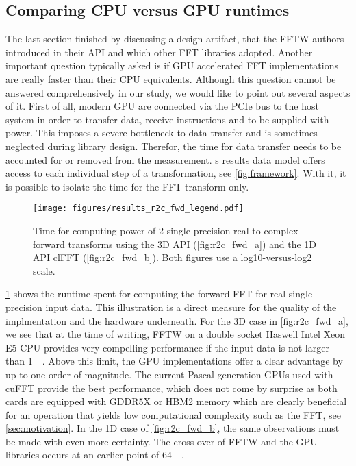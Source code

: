 \subsection{Comparing CPU versus GPU runtimes}
\label{ssec:cpu_vs_gpu}

The last section finished by discussing a design artifact, that the FFTW authors introduced in their API and which other FFT libraries adopted. Another important question typically asked is if GPU accelerated FFT implementations are really faster than their CPU equivalents. Although this question cannot be answered comprehensively in our study, we would like to point out several aspects of it. First of all, modern GPU are connected via the PCIe bus to the host system in order to transfer data, receive instructions and to be supplied with power. This imposes a severe bottleneck to data transfer and is sometimes neglected during library design. Therefor, the time for data transfer needs to be accounted for or removed from the measurement. \gearshifft{}s results data model offers access to each individual step of a transformation, see \cref{fig:framework}. With it, it is possible to isolate the time for the FFT transform only.

\begin{figure}[!tbp]
  \centering
  \texttt{[image: figures/results\_r2c\_fwd\_legend.pdf]}\vspace{-1em}
  \hfill
  \caption{Time for computing power-of-2 single-precision real-to-complex forward transforms using the 3D API (\cref{fig:r2c_fwd_a}) and the 1D API clFFT (\cref{fig:r2c_fwd_b}). Both figures use a log10-versus-log2 scale.}
  \label{fig:r2c_fwd}
\end{figure}

\cref{fig:r2c_fwd} shows the runtime spent for computing the forward FFT for real single precision input data. This illustration is a direct measure for the quality of the implmentation and the hardware underneath. For the 3D case in \cref{fig:r2c_fwd_a}, we see that at the time of writing, FFTW on a double socket Haswell Intel Xeon E5 CPU provides very compelling performance if the input data is not larger than \SI{1}{\mebi\byte}. Above this limit, the GPU implementations offer a clear advantage by up to one order of magnitude. The current Pascal generation GPUs used with cuFFT provide the best performance, which does not come by surprise as both cards are equipped with GDDR5X or HBM2 memory which are clearly beneficial for an operation that yields low computational complexity such as the FFT, see \cref{sec:motivation}. In the 1D case of \cref{fig:r2c_fwd_b}, the same observations must be made with even more certainty. The cross-over of FFTW and the GPU libraries occurs at an earlier point of \SI{64}{\kibi\byte}.  

